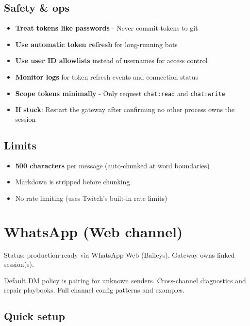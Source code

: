 \subsection{Safety \& ops}


\begin{itemize}
  \item \textbf{Treat tokens like passwords} - Never commit tokens to git
  \item \textbf{Use automatic token refresh} for long-running bots
  \item \textbf{Use user ID allowlists} instead of usernames for access control
  \item \textbf{Monitor logs} for token refresh events and connection status
  \item \textbf{Scope tokens minimally} - Only request \texttt{chat:read} and \texttt{chat:write}
  \item \textbf{If stuck}: Restart the gateway after confirming no other process owns the session
\end{itemize}


\subsection{Limits}


\begin{itemize}
  \item \textbf{500 characters} per message (auto-chunked at word boundaries)
  \item Markdown is stripped before chunking
  \item No rate limiting (uses Twitch's built-in rate limits)
\end{itemize}



\clearpage

\section{WhatsApp (Web channel)}


Status: production-ready via WhatsApp Web (Baileys). Gateway owns linked session(s).

Default DM policy is pairing for unknown senders.
Cross-channel diagnostics and repair playbooks.
Full channel config patterns and examples.

\subsection{Quick setup}



